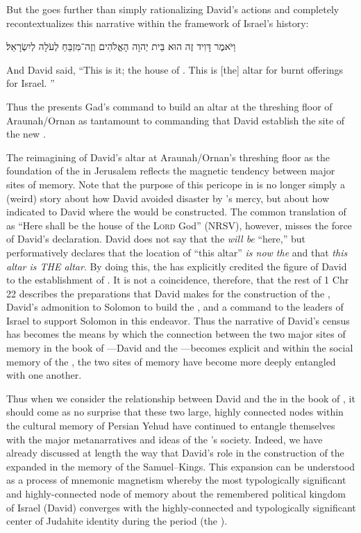 But the \chronicler goes further than simply rationalizing David's actions and completely recontextualizes this narrative within the framework of Israel's history:
\begin{hebrewtext}
    וַיֹּאמֶר דָּוִיד זֶה הוּא בֵּית יְהוָה הָאֱלֹהִים וְזֶה־מִּזְבֵּחַ לְעֹלָה לְיִשְׂרָאֵל׃ 
\end{hebrewtext}
\begin{translation}
    And David said, ``This is it; the house of \yahweh. This is [the] altar for burnt offerings for Israel. ''
\end{translation}
\noindent
Thus the \chronicler presents Gad's command to build an altar at the threshing floor of Araunah/Ornan as tantamount to commanding that David establish the site of the new \temple.  

The reimagining of David's altar at Araunah/Ornan's threshing floor as the foundation of the \temple in Jerusalem reflects the magnetic tendency between major sites of memory. Note that the purpose of this pericope in \chronicles is no longer simply a (weird) story about how David avoided disaster by \yahweh's mercy, but about how \yahweh indicated to David where the \temple would be constructed. The common translation of  as ``Here shall be the house of the \textsc{Lord} God'' (NRSV), however, misses the force of David's declaration. David does not say that the \temple \emph{will be} ``here,'' but performatively declares that the location of ``this altar'' \emph{is now the \temple} and that \emph{this altar is THE altar}. By doing this, the \chronicler has explicitly credited the figure of David to the establishment of \solomonstemple. It is not a coincidence, therefore, that the rest of 1 Chr 22 describes the preparations that David makes for the construction of the \temple, David's admonition to Solomon to build the \temple, and a command to the leaders of Israel to support Solomon in this endeavor. Thus the narrative of David's census has becomes the means by which the connection between the two major sites of memory in the book of \chronicles---David and the \temple---becomes explicit and within the social memory of the \chronicler, the two sites of memory have become more deeply entangled with one another. 

Thus when we consider the relationship between David and the \temple in the book of \chronicles, it should come as no surprise that these two large, highly connected nodes within the cultural memory of Persian Yehud have continued to entangle themselves with the major metanarratives and ideas of the \chronicler's society. Indeed, we have already discussed at length the way that David's role in the construction of the \temple expanded in the memory of the \chronicler \visavis Samuel--Kings. This expansion can be understood as a process of mnemonic magnetism whereby the most typologically significant and highly-connected node of memory about the remembered political kingdom of Israel (David) converges with the highly-connected and typologically significant center of Judahite identity during the \secondtemple period (the \temple). 

